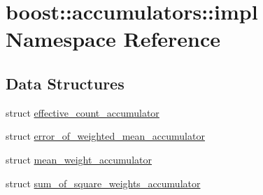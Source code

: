 \hypertarget{namespaceboost_1_1accumulators_1_1impl}{\section{boost\-:\-:accumulators\-:\-:impl Namespace Reference}
\label{namespaceboost_1_1accumulators_1_1impl}
}
\subsection*{Data Structures}
\begin{DoxyCompactItemize}
\item 
struct \hyperlink{structboost_1_1accumulators_1_1impl_1_1effective__count__accumulator}{effective\-\_\-count\-\_\-accumulator}
\item 
struct \hyperlink{structboost_1_1accumulators_1_1impl_1_1error__of__weighted__mean__accumulator}{error\-\_\-of\-\_\-weighted\-\_\-mean\-\_\-accumulator}
\item 
struct \hyperlink{structboost_1_1accumulators_1_1impl_1_1mean__weight__accumulator}{mean\-\_\-weight\-\_\-accumulator}
\item 
struct \hyperlink{structboost_1_1accumulators_1_1impl_1_1sum__of__square__weights__accumulator}{sum\-\_\-of\-\_\-square\-\_\-weights\-\_\-accumulator}
\end{DoxyCompactItemize}
